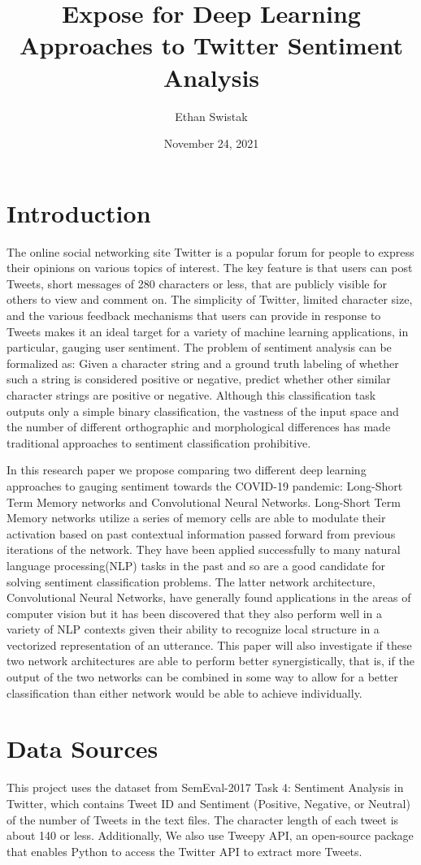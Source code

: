 \documentclass{article}
\title{Expose for Deep Learning Approaches to Twitter Sentiment Analysis}
\author{Ethan Swistak}
\date{November 24, 2021}
\begin{document}
\maketitle

\section{Introduction}
The online social networking site Twitter is a popular forum for people to express their opinions on various topics of interest. The key feature is that users can post Tweets, short messages of 280 characters or less, that are publicly visible for others to view and comment on. The simplicity of Twitter, limited character size, and the various feedback mechanisms that users can provide in response to Tweets makes it an ideal target for a variety of machine learning applications, in particular, gauging user sentiment. The problem of sentiment analysis can be formalized as: Given a character string and a ground truth labeling of whether such a string is considered positive or negative, predict whether other similar character strings are positive or negative. Although this classification task outputs only a simple binary classification, the vastness of the input space and the number of different orthographic and morphological differences  has made traditional approaches to sentiment classification prohibitive. 

In this research paper we propose comparing two different deep learning approaches to gauging sentiment towards the COVID-19 pandemic: Long-Short Term Memory networks and Convolutional Neural Networks. Long-Short Term Memory networks utilize a series of memory cells are able to modulate their activation based on past contextual information passed forward from previous iterations of the network. They have been applied successfully to many natural language processing(NLP) tasks in the past and so are a good candidate for solving sentiment classification problems. The latter network architecture, Convolutional Neural Networks, have generally found applications in the areas of computer vision but it has been discovered that they also perform well in a variety of NLP contexts given their ability to recognize local structure in a vectorized representation of an utterance. This paper will also investigate if these two network architectures are able to perform better synergistically, that is, if the output of the two networks can be combined in some way to allow for a better classification than either network would be able to achieve individually.


\section{Data Sources}
This project uses the dataset from SemEval-2017 Task 4: Sentiment Analysis in Twitter, which contains Tweet ID and Sentiment (Positive, Negative, or Neutral) of the number of Tweets in the text files.
The character length of each tweet is about 140 or less. Additionally, We also use Tweepy API, an open-source package that enables Python to access the Twitter API to extract more Tweets. 
\end{document}
